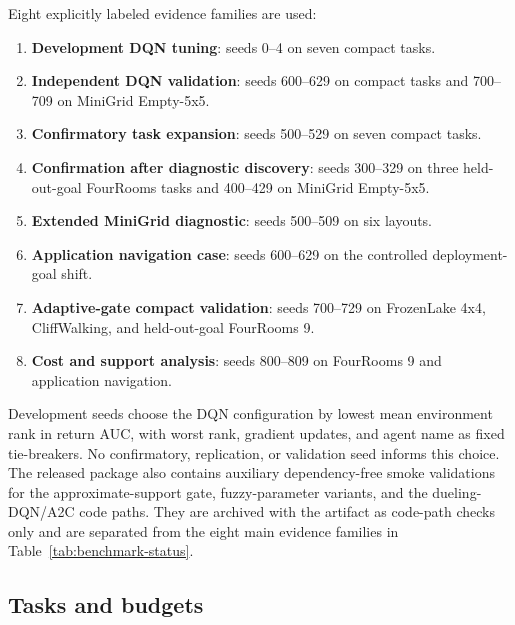 \documentclass[preprint,12pt]{elsarticle}
\begin{document}
Eight explicitly labeled evidence families are used:
\begin{enumerate}
  \item \textbf{Development DQN tuning}: seeds 0--4 on seven compact tasks.
  \item \textbf{Independent DQN validation}: seeds 600--629 on compact tasks
  and 700--709 on MiniGrid Empty-5x5.
  \item \textbf{Confirmatory task expansion}: seeds 500--529 on seven compact
  tasks.
  \item \textbf{Confirmation after diagnostic discovery}: seeds 300--329 on
  three held-out-goal FourRooms tasks and 400--429 on MiniGrid Empty-5x5.
  \item \textbf{Extended MiniGrid diagnostic}: seeds 500--509 on six layouts.
  \item \textbf{Application navigation case}: seeds 600--629 on the controlled
  deployment-goal shift.
  \item \textbf{Adaptive-gate compact validation}: seeds 700--729 on
  FrozenLake 4x4, CliffWalking, and held-out-goal FourRooms 9.
  \item \textbf{Cost and support analysis}: seeds 800--809 on FourRooms 9 and
  application navigation.
\end{enumerate}
Development seeds choose the DQN configuration by lowest mean environment rank
in return AUC, with worst rank, gradient updates, and agent name as fixed
tie-breakers. No confirmatory, replication, or validation seed informs this
choice. The released package also contains auxiliary dependency-free smoke
validations for the approximate-support gate, fuzzy-parameter variants, and the
dueling-DQN/A2C code paths. They are archived with the artifact as code-path
checks only and are separated from the eight main evidence families in
Table~\ref{tab:benchmark-status}.

\subsection{Tasks and budgets}
\end{document}
